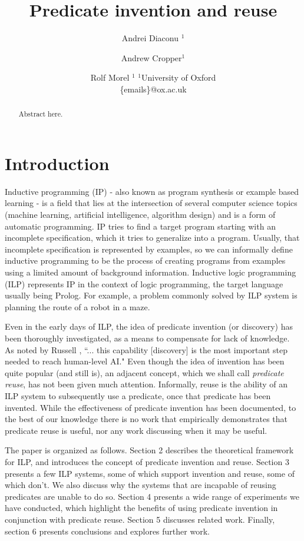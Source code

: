 \documentclass{article}
\title{Predicate invention and reuse}
\author{
Andrei Diaconu $^1$
\and
Andrew Cropper$^1$\and
Rolf Morel $^1$
\affiliations
$^1$University of Oxford\\
\emails
\{emails\}@ox.ac.uk}
\theoremstyle{definition}
\begin{document}
\maketitle




\begin{abstract}
Abstract here.
\end{abstract}




\section{Introduction}
Inductive programming (IP) \cite{indprogmeets} - also known as program synthesis or example based learning - is a field that lies at the intersection of several computer science topics (machine learning, artificial intelligence, algorithm design) and is a form of automatic programming. IP tries to find a target program starting with an incomplete specification, which it tries to generalize into a program. Usually, that incomplete specification is represented by examples, so we can informally define inductive programming to be the process of creating programs from examples using a limited amount of background information. Inductive logic programming (ILP) represents IP in the context of logic programming, the target language usually being Prolog. For example, a problem commonly solved by ILP system is planning the route of a robot in a maze. 

\par Even in the early days of ILP, the idea of predicate invention (or discovery) has been thoroughly investigated, as a means to compensate for lack of knowledge. As noted by Russell \cite{humancompatible}, ``... this capability [discovery] is the most important step needed to reach human-level AI." Even though the idea of invention has been quite popular (and still is), an adjacent concept, which we shall call \emph{predicate reuse}, has not been given much attention. Informally, reuse is the ability of an ILP system to subsequently use a predicate, once that predicate has been invented. While the effectiveness of predicate invention has been documented, to the best of our knowledge there is no work that empirically demonstrates that predicate reuse is useful, nor any work discussing when it may be useful. 

\par The paper is organized as follows. Section 2 describes the theoretical framework for ILP, and introduces the concept of predicate invention and reuse. Section 3 presents a few ILP systems, some of which support invention and reuse, some of which don't. We also discuss why the systems that are incapable of reusing predicates are unable to do so. Section 4 presents a wide range of experiments we have conducted, which highlight the benefits of using predicate invention in conjunction with predicate reuse. Section 5 discusses related work. Finally, section 6 presents conclusions and explores further work.
\end{document}
